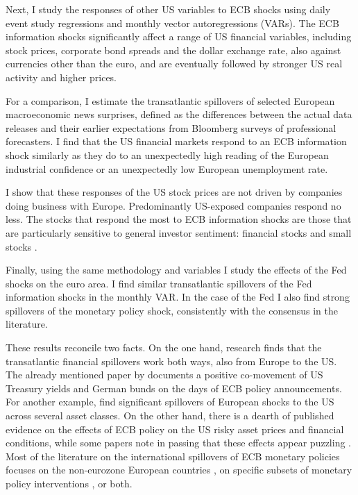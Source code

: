 \documentclass[a4paper,12pt]{article}
\begin{document}
Next, I study the responses of other US variables to ECB shocks
using daily event study regressions and monthly vector autoregressions (VARs).
The ECB information shocks significantly affect a range of US financial variables, 
including stock prices, corporate bond spreads and the dollar exchange rate, also against currencies
other than the euro, and are eventually followed by stronger US real activity and higher prices.

For a comparison, I estimate the transatlantic spillovers of selected European macroeconomic news surprises,
defined as the differences between the actual data releases and their earlier expectations from Bloomberg surveys of professional forecasters.
I find that the US financial markets respond to an ECB information shock similarly as they do
to an unexpectedly high reading of the European industrial confidence or an unexpectedly low European unemployment rate.

I show that these responses of the US stock prices are not driven by companies doing business with Europe.
Predominantly US-exposed companies respond no less. The stocks that respond the most to ECB information shocks are those that are particularly sensitive to general investor sentiment: financial stocks and small stocks \citep{Baker_Wurgler_2006}.

Finally, using the same methodology and variables I study the effects of the Fed shocks on the euro area. I find similar transatlantic spillovers of the Fed information shocks in the monthly VAR.
In the case of the Fed I also find strong spillovers of the monetary policy shock, consistently with the consensus in the literature.

These results reconcile two facts. On the one hand, research finds that the transatlantic financial spillovers work both ways, also from Europe to the US. The already mentioned paper by 
\cite{Curcuru_DePooter_Eckerd_2018} documents a positive co-movement of US Treasury yields and German bunds on the days of ECB policy announcements. 
For another example, \cite{Ehrmann_etal_2011} find significant spillovers of European shocks to the US across several asset classes.
On the other hand, there is a dearth of published evidence on the effects of ECB policy on the US risky asset prices and financial conditions, while
some papers note in passing that these effects appear puzzling \citep{Rogers_Scotti_Wright_2014,Brusa_etal_2020}.
Most of the literature on the international spillovers of ECB monetary policies focuses on the non-eurozone European countries \citep[e.g.][]{Bluwstein_Canova_2016,Moder_2019,Feldkircher_etal_2020,terEllen_etal_2020,Corsetti_etal_2021},
on specific subsets of monetary policy interventions \citep{Georgiadis_Grab_2016}, or both.
\end{document}
